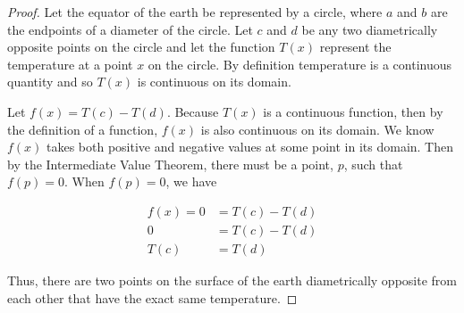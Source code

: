 \documentclass{article}
\begin{document}
    \begin{proof}
        Let the equator of the earth be represented by a circle, where $a$ and $b$ are the endpoints of a diameter of the circle. Let $c$ and $d$ be any two diametrically opposite points on the circle and let the
        function $T(x)$ represent the temperature at a point $x$ on the circle. By definition temperature is a continuous quantity and so $T(x)$ is continuous on its domain.

        \begin{center}
        \end{center}

        Let $f(x) = T(c)-T(d)$. Because $T(x)$ is a continuous function, then by the definition of a function, $f(x)$ is also continuous on its domain. We know $f(x)$ takes both positive and negative values at some
        point in its domain. Then by the Intermediate Value Theorem, there must be a point, $p$, such that $f(p)=0$. When $f(p)=0$, we have

        \begin{align*}
            f(x) = 0 &= T(c) - T(d) \\
                   0 &= T(c) - T(d) \\
               T(c)  &= T(d)
        \end{align*}

        Thus, there are two points on the surface of the earth diametrically opposite from each other that have the exact same temperature.
    \end{proof}

%
\end{document}
